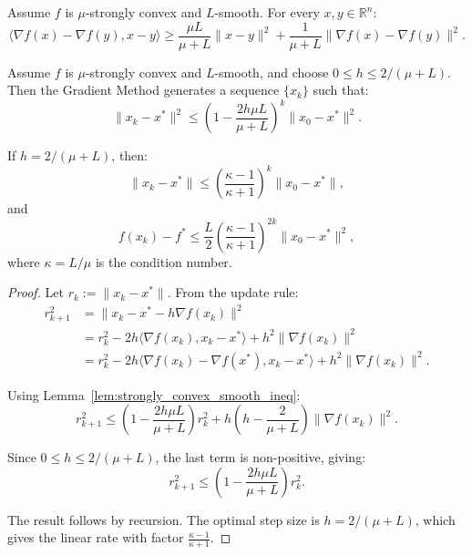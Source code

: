 \begin{lemma}
  \label{lem:strongly_convex_smooth_ineq}
  \leanok
  Assume $f$ is $\mu$-strongly convex and $L$-smooth. For every $x, y \in \mathbb{R}^n$:
  \[
    \langle\nabla f(x) - \nabla f(y), x - y\rangle \geq \frac{\mu L}{\mu + L}\|x - y\|^2 + \frac{1}{\mu + L}\|\nabla f(x) - \nabla f(y)\|^2.
  \]
\end{lemma}

\begin{theorem}
  \label{thm:strongly_convex_convergence}
  \leanok
  Assume $f$ is $\mu$-strongly convex and $L$-smooth, and choose $0 \leq h \leq 2/(\mu + L)$. Then the Gradient Method generates a sequence $\{x_k\}$ such that:
  \[
    \|x_k - x^*\|^2 \leq \left(1 - \frac{2h\mu L}{\mu + L}\right)^k \|x_0 - x^*\|^2.
  \]
  
  If $h = 2/(\mu + L)$, then:
  \[
    \|x_k - x^*\| \leq \left(\frac{\kappa - 1}{\kappa + 1}\right)^k \|x_0 - x^*\|,
  \]
  and
  \[
    f(x_k) - f^* \leq \frac{L}{2}\left(\frac{\kappa - 1}{\kappa + 1}\right)^{2k} \|x_0 - x^*\|^2,
  \]
  where $\kappa = L/\mu$ is the condition number.
\end{theorem}

\begin{proof}
  Let $r_k := \|x_k - x^*\|$. From the update rule:
  \begin{align}
    r_{k+1}^2 &= \|x_k - x^* - h\nabla f(x_k)\|^2 \\
    &= r_k^2 - 2h\langle\nabla f(x_k), x_k - x^*\rangle + h^2\|\nabla f(x_k)\|^2 \\
    &= r_k^2 - 2h\langle\nabla f(x_k) - \nabla f(x^*), x_k - x^*\rangle + h^2\|\nabla f(x_k)\|^2.
  \end{align}
  
  Using Lemma~\ref{lem:strongly_convex_smooth_ineq}:
  \[
    r_{k+1}^2 \leq \left(1 - \frac{2h\mu L}{\mu + L}\right)r_k^2 + h\left(h - \frac{2}{\mu + L}\right)\|\nabla f(x_k)\|^2.
  \]
  
  Since $0 \leq h \leq 2/(\mu + L)$, the last term is non-positive, giving:
  \[
    r_{k+1}^2 \leq \left(1 - \frac{2h\mu L}{\mu + L}\right)r_k^2.
  \]
  
  The result follows by recursion. The optimal step size is $h = 2/(\mu + L)$, which gives the linear rate with factor $\frac{\kappa - 1}{\kappa + 1}$.
\end{proof}

